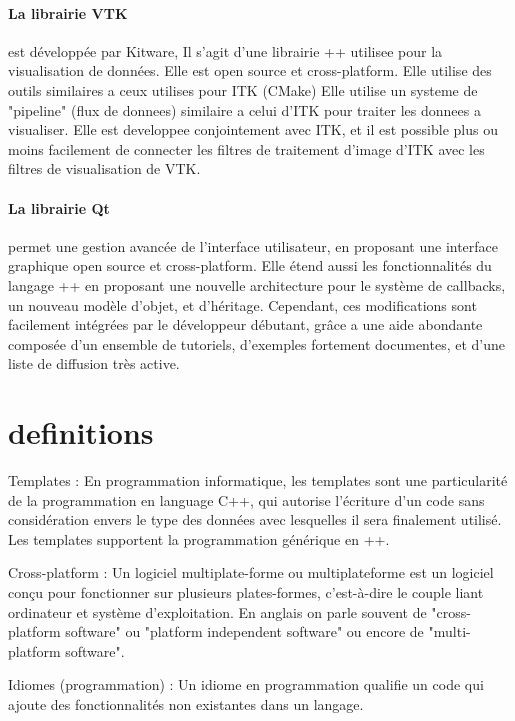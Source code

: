 \paragraph{La librairie VTK} est développée par Kitware, Il s'agit d'une librairie \C++ utilisee pour la visualisation de données. Elle est open source et cross-platform. Elle utilise des outils similaires a ceux utilises pour ITK (CMake)
Elle utilise un systeme de "pipeline" (flux de donnees) similaire a celui d'ITK pour traiter les donnees a visualiser. Elle est developpee conjointement avec ITK, et il est possible plus ou moins facilement de connecter les filtres de traitement d'image d'ITK avec les filtres de visualisation de VTK.

\paragraph{La librairie Qt} permet une gestion avancée de l'interface utilisateur, en proposant une interface graphique open source et cross-platform.
Elle étend aussi les fonctionnalités du langage \C++ en proposant une nouvelle architecture pour le système de callbacks, un nouveau modèle d'objet, et d'héritage. Cependant, ces modifications sont facilement intégrées par le développeur débutant, grâce a une aide abondante composée d'un ensemble de tutoriels, d'exemples fortement documentes, et d'une liste de diffusion très active.







\section{definitions}




Templates : En programmation informatique, les templates sont une particularité de la programmation en language C++, qui autorise l'écriture d'un code sans considération envers le type des données avec lesquelles il sera finalement utilisé. Les templates supportent la programmation générique en {\C++}.

Cross-platform : Un logiciel multiplate-forme ou multiplateforme est un logiciel conçu pour fonctionner sur plusieurs plates-formes, c’est-à-dire le couple liant ordinateur et système d’exploitation. En anglais on parle souvent de "cross-platform software" ou "platform independent software" ou encore de "multi-platform software".

Idiomes (programmation) :  Un idiome en programmation qualifie un code qui ajoute des fonctionnalités non existantes dans un
langage.

